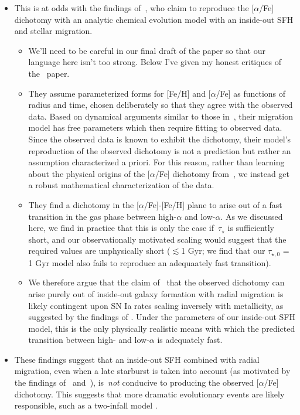 \documentclass[fleqn, usenatbib]{mnras}
\begin{document}
\begin{itemize}
	\item This is at 
	odds with the findings of~\citet{Sharma2020}, who claim to reproduce the 
	[$\alpha$/Fe] dichotomy with an analytic chemical evolution model with 
	an inside-out SFH and stellar migration. 
	\begin{itemize} 
		\item {\color{red} We'll need to be careful in our final draft of the 
		paper so that our language here isn't too strong. Below I've given my 
		honest critiques of the~\citet{Sharma2020} paper. } 

		\item They assume parameterized forms for [Fe/H] and [$\alpha$/Fe] as 
		functions of radius and time, chosen deliberately so 
		that they agree with the observed data. Based on dynamical arguments 
		similar to those in~\citet{Schoenrich2009}, their migration model has 
		free parameters which then require fitting to observed data. Since the 
		observed data is known to exhibit the dichotomy, their model's 
		reproduction of the observed dichotomy is not a prediction but rather 
		an assumption characterized a priori. For this reason, rather than 
		learning about the physical origins of the [$\alpha$/Fe] dichotomy 
		from~\citet{Sharma2020}, we instead get a robust mathematical 
		characterization of the data. 

		\item They find a dichotomy in the [$\alpha$/Fe]-[Fe/H] plane to 
		arise out of a fast transition in the gas phase between high-$\alpha$ 
		and low-$\alpha$. As we discussed here, we find in practice that this 
		is only the case if~$\tau_\star$ is sufficiently short, and our 
		observationally motivated scaling would suggest that the required 
		values are unphysically short ($\lesssim$1 Gyr; we find that our 
		$\tau_{\star,0}$ = 1 Gyr model also fails to reproduce an adequaately 
		fast transition). 

		\item We therefore argue that the claim of~\citet{Sharma2020} that 
		the observed dichotomy can arise purely out of inside-out galaxy 
		formation with radial migration is likely contingent upon SN Ia rates 
		scaling inversely with metallicity, as suggested by the findings of 
		\citet{Brown2019}. Under the parameters of our inside-out SFH model, 
		this is the only physically realistic means with which the predicted 
		transition between high- and low-$\alpha$ is adequately fast. 
	\end{itemize} 

	\item These findings suggest that an inside-out SFH combined with radial 
	migration, even when a late starburst is taken into account (as motivated 
	by the findings of~\citealp{Isern2019} and~\citealp{Mor2019}), 
	is~\textit{not} conducive to producing the observed [$\alpha$/Fe] 
	dichotomy. This suggests that more dramatic evolutionary events are 
	likely responsible, such as a two-infall model 
	\citep[e.g.][]{Chiappini1997, Chiappini2001, Romano2010, Grisoni2017, 
	Noguchi2018, Spitoni2016, Spitoni2018, Spitoni2019, Spitoni2020}. 
\end{itemize} 
\end{document}
